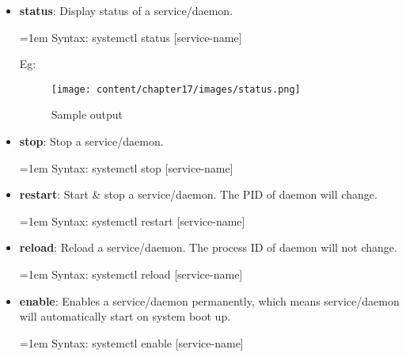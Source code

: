 \begin{flushleft}
\begin{itemize}
\begin{itemize}
		\bigskip
		\bigskip

		\item \textbf{status}: Display status of a service/daemon.	 
		\bigskip
		\begin{tcolorbox}[breakable,notitle,boxrule=0pt,colback=pink,colframe=pink]
			\color{black}
			\font=1em
			Syntax: systemctl status [service-name]
			\font=4pt
		\end{tcolorbox}
		
		Eg:
		\begin{figure}[h!]
			\centering
			\texttt{[image: content/chapter17/images/status.png]}
			\caption{Sample output}
			\label{fig:free_h_s}
		\end{figure}
		
		\item \textbf{stop}: Stop a service/daemon.	 
		\bigskip
		\begin{tcolorbox}[breakable,notitle,boxrule=0pt,colback=pink,colframe=pink]
			\color{black}
			\font=1em
			Syntax: systemctl stop [service-name]
			\font=4pt
		\end{tcolorbox}

		\newpage
		
		\item \textbf{restart}: Start \& stop a service/daemon. The PID of daemon will change.	
		\bigskip
		\begin{tcolorbox}[breakable,notitle,boxrule=0pt,colback=pink,colframe=pink]
			\color{black}
			\font=1em
			Syntax: systemctl restart [service-name]
			\font=4pt
		\end{tcolorbox}		
		
		\bigskip
		\bigskip
		
		\item \textbf{reload}: Reload a service/daemon. The process ID of daemon will not change.	 
		\bigskip
		\begin{tcolorbox}[breakable,notitle,boxrule=0pt,colback=pink,colframe=pink]
			\color{black}
			\font=1em
			Syntax: systemctl reload [service-name]
			\font=4pt
		\end{tcolorbox}		
		
		\bigskip
		\bigskip
		
		\item \textbf{enable}: Enables a service/daemon permanently, which means service/daemon will automatically start on system boot up.
		\bigskip
		\begin{tcolorbox}[breakable,notitle,boxrule=0pt,colback=pink,colframe=pink]
			\color{black}
			\font=1em
			Syntax: systemctl enable [service-name]
			\font=4pt
		\end{tcolorbox}		


\end{itemize}
\end{itemize}
\end{flushleft}
